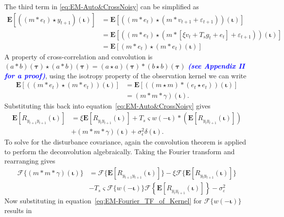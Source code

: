 \documentclass[]{article}
\newcommand{\parham}[1]{\textsf{\emph{\textbf{\textcolor{blue}{#1}}}}}
\begin{document}
The third term in \eqref{eq:EM-Auto&CrossNoisy} can be simplified as
\begin{align}\label{eq:EM-term3Noisy}
\mathbf{E}[((m\ast e_t)\star y_{t+1})(\boldsymbol\iota)] &= \mathbf{E}[((m\ast e_t)\star (m\ast v_{t+1}+\varepsilon_{t+1})) (\boldsymbol\iota)] \nonumber \\
	&= \mathbf{E}[(\left(m \ast e_t\right) \star (m \ast [\xi v_t + T_s g_t + e_t]+\varepsilon_{t+1}))(\boldsymbol\iota)] \nonumber \\
	&=\mathbf{E}[\left(m \ast e_t\right)\star\left(m \ast e_t\right)(\boldsymbol\iota)]
\end{align}
A property of cross-correlation and convolution is $(a \ast b)(\boldsymbol\tau) \star (a \ast b)(\boldsymbol\tau)=(a \star a)(\boldsymbol\tau)\ast(b \star b)(\boldsymbol\tau)$ \parham{(see Appendix II for a proof)}, using the isotropy property of the observation kernel we can write
\begin{align}\label{eq:EM-Autoterm4}
\mathbf{E}[(\left(m \ast e_t\right)\star\left(m \ast e_t\right))(\boldsymbol\iota)]&=\mathbf{E}[(\left(m \star m\right)\ast\left(e_t \star e_t\right))(\boldsymbol\iota)] \nonumber \\
&=(m\ast m \ast \gamma)(\boldsymbol\iota).
\end{align}
Substituting this back into equation~\eqref{eq:EM-Auto&CrossNoisy} gives
\begin{align}
	\mathbf{E}[R_{y_{t+1}y_{t+1}}(\boldsymbol{\iota})] &= \xi \mathbf{E}[R_{y_ty_{t+1}}(\boldsymbol{\iota})]+T_s\varsigma w(-\boldsymbol\iota) \ast (\mathbf{E}\left[R_{y_ty_{t+1}}(\boldsymbol\iota)\right] ) \nonumber \\
	&+(m\ast m \ast \gamma)(\boldsymbol\iota) +\sigma_{\epsilon}^2\delta(\boldsymbol{\iota}).
\end{align}
To solve for the disturbance covariance, again the convolution theorem is applied to perform the deconvolution algebraically. Taking the Fourier transform and rearranging gives
\begin{align}
	\mathcal{F}\{(m\ast m \ast \gamma)(\boldsymbol\iota)\} &= \mathcal{F}\{\mathbf{E}[R_{y_{t+1}y_{t+1}}(\boldsymbol{\iota})]\}-\xi \mathcal{F}\{\mathbf{E}[R_{y_ty_{t+1}}(\boldsymbol{\iota})]\}\nonumber \\ 
	&- T_s\varsigma\mathcal{F}\{w(-\boldsymbol\iota)\}\mathcal{F}\left\{\mathbf{E}\left[R_{y_ty_{t+1}}(\boldsymbol\iota)\right] \right\}-\sigma_{\varepsilon}^2 
\end{align}
Now substituting in equation~\eqref{eq:EM-Fourier_TF_of_Kernel} for $\mathcal{F}\{w(-\boldsymbol{\iota})\}$ results in
\end{document}
